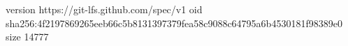 version https://git-lfs.github.com/spec/v1
oid sha256:4f2197869265eeb66c5b8131397379fea58c9088c64795a6b4530181f98389e0
size 14777
